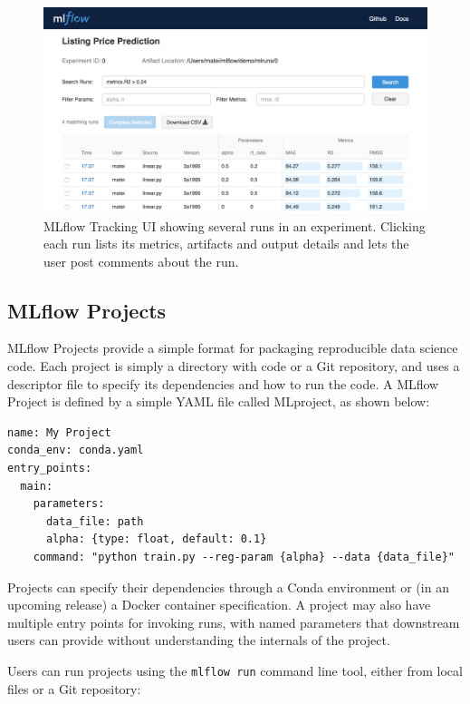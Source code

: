 \documentclass[11pt]{article}
\begin{document}
\begin{figure}[h]
\centering
\includegraphics[bb=0 0 1052 564,width=\textwidth]{tracking.png}
\caption{MLflow Tracking UI showing several runs in an experiment. Clicking each run lists its metrics, artifacts and output details and lets the user post comments about the run.}
\label{fig:tracking-ui}
\end{figure}

\subsection{MLflow Projects}

MLflow Projects provide a simple format for packaging reproducible data science code. Each project is simply a directory with code or a Git repository, and uses a descriptor file to specify its dependencies and how to run the code. A MLflow Project is defined by a simple YAML file called MLproject, as shown below:

\begin{Verbatim}[frame=single,fontsize=\small,samepage=true]
name: My Project
conda_env: conda.yaml
entry_points:
  main:
    parameters:
      data_file: path
      alpha: {type: float, default: 0.1}
    command: "python train.py --reg-param {alpha} --data {data_file}"
\end{Verbatim}


Projects can specify their dependencies through a Conda environment or (in an upcoming release) a Docker container specification. A project may also have multiple entry points for invoking runs, with named parameters that downstream users can provide without understanding the internals of the project.

Users can run projects using the \texttt{mlflow run} command line tool, either from local files or a Git repository:
\end{document}
